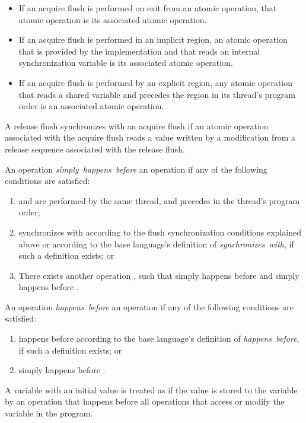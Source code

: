 \begin{itemize}
\item If an acquire flush is performed on exit from an atomic operation, that
    atomic operation is its associated atomic operation.
\item If an acquire flush is performed in an implicit  region, an  
    atomic operation that is provided by the implementation and that reads an 
    internal synchronization variable is its associated atomic operation.
\item If an acquire flush is performed by an explicit  region, any
    atomic operation that reads a shared variable and precedes the
     region in its thread's program order is an associated atomic
    operation.
\end{itemize}

A release flush synchronizes with an acquire flush if an atomic operation
associated with the acquire flush reads a value written by a modification from
a release sequence associated with the release flush.

An operation  \emph{simply~happens~before} an operation  
if any of the following conditions are satisfied:
\begin{enumerate}
\item {} and  are performed by the same thread, and  
      precedes  in the thread's program order;
\item {} synchronizes with  according to the flush 
      synchronization conditions explained above or according
      to the base language's definition of \emph{synchronizes~with}, 
      if such a definition exists; or
\item There exists another operation , such that  simply 
      happens before  and  simply happens before .
\end{enumerate}

An operation  \emph{happens~before} an operation  
if any of the following conditions are satisfied:
\begin{enumerate}
\item {} happens before  according to the base language's 
      definition of \emph{happens~before}, if such a definition exists; or
\item {} simply happens before .
\end{enumerate}

A variable with an initial value is treated as if the value is stored to the
variable by an operation that happens before all operations that access or
modify the variable in the program.

